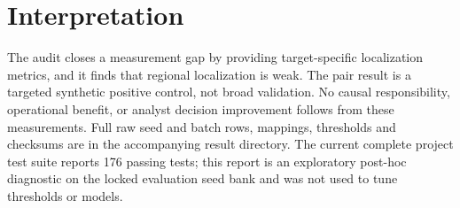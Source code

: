 \documentclass[10pt]{article}
\begin{document}
\section*{Interpretation}
The audit closes a measurement gap by providing target-specific localization metrics, and it finds that regional localization is weak. The pair result is a targeted synthetic positive control, not broad validation. No causal responsibility, operational benefit, or analyst decision improvement follows from these measurements. Full raw seed and batch rows, mappings, thresholds and checksums are in the accompanying result directory. The current complete project test suite reports 176 passing tests; this report is an exploratory post-hoc diagnostic on the locked evaluation seed bank and was not used to tune thresholds or models.
\end{document}
